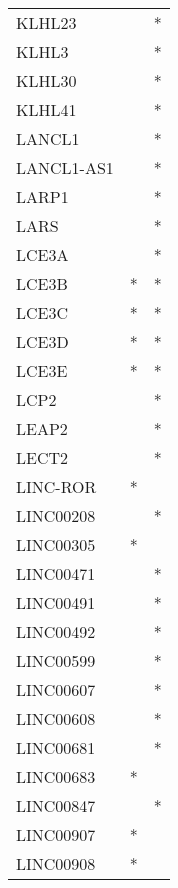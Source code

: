 \begin{longtable}{lcc}
KLHL23          &                &          * \\
KLHL3           &                &          * \\
KLHL30          &                &          * \\
KLHL41          &                &          * \\
LANCL1          &                &          * \\
LANCL1-AS1      &                &          * \\
LARP1           &                &          * \\
LARS            &                &          * \\
LCE3A           &                &          * \\
LCE3B           &              * &          * \\
LCE3C           &              * &          * \\
LCE3D           &              * &          * \\
LCE3E           &              * &          * \\
LCP2            &                &          * \\
LEAP2           &                &          * \\
LECT2           &                &          * \\
LINC-ROR        &              * &            \\
LINC00208       &                &          * \\
LINC00305       &              * &            \\
LINC00471       &                &          * \\
LINC00491       &                &          * \\
LINC00492       &                &          * \\
LINC00599       &                &          * \\
LINC00607       &                &          * \\
LINC00608       &                &          * \\
LINC00681       &                &          * \\
LINC00683       &              * &            \\
LINC00847       &                &          * \\
LINC00907       &              * &            \\
LINC00908       &              * &            \\

\end{longtable}
